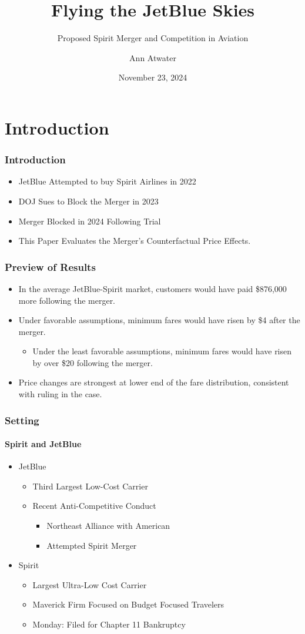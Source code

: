 \documentclass[xcolor=dvipsnames]{beamer}
\author{Ann Atwater}
\institute{University of Florida}
\title{Flying the JetBlue Skies}
\subtitle{Proposed Spirit Merger and Competition in Aviation}
\date{November 23, 2024}
\begin{document}
	\section{Introduction}
	\frame{\titlepage}
		
	\begin{frame}
		\frametitle{Introduction}
		\begin{itemize}
			\item JetBlue Attempted to buy Spirit Airlines in 2022
			\item DOJ Sues to Block the Merger in 2023
			\item Merger Blocked in 2024 Following Trial 
			\item This Paper Evaluates the Merger's Counterfactual Price Effects. 
		\end{itemize}
	\end{frame}
	
	\begin{frame}
		\frametitle{Preview of Results}
		\begin{itemize}
			\item  In the average JetBlue-Spirit market, customers would have paid \$876,000 more following the merger. 
			\item Under favorable assumptions, minimum fares would have risen by \$4 after the merger.
			\begin{itemize}
				\item Under the least favorable assumptions, minimum fares would have risen by over \$20 following the merger. 
			\end{itemize}
			\item Price changes are strongest at lower end of the fare distribution, consistent with ruling in the case.
		\end{itemize}
	\end{frame}
		
	\begin{frame}
		\frametitle{Setting}
		\framesubtitle{Spirit and JetBlue}
			\begin{itemize}
			\item JetBlue 
			\begin{itemize}
				\item Third Largest Low-Cost Carrier 
				\item Recent Anti-Competitive Conduct
				\begin{itemize}
					\item Northeast Alliance with American
					\item Attempted Spirit Merger
				\end{itemize}
			\end{itemize}
			\item Spirit 
			\begin{itemize}
				\item Largest Ultra-Low Cost Carrier
				\item Maverick Firm Focused on Budget Focused Travelers 
				\item Monday: Filed for Chapter 11 Bankruptcy
			\end{itemize}
		\end{itemize} 
	\end{frame}
\end{document}
